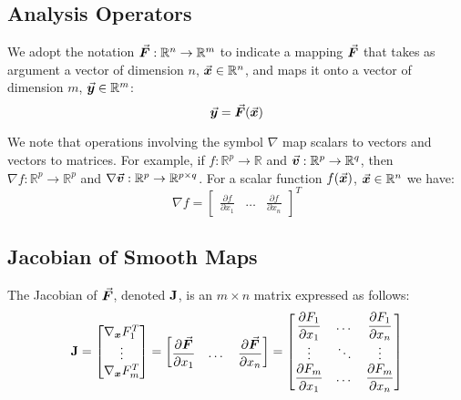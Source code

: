 \begin{appendices}
\section*{Analysis Operators}

We adopt the notation $\vec{\bm{F}}:\mathbb{R}^n\rightarrow\mathbb{R}^m$ to 
indicate a 
mapping $\vec{\bm{F}}$ that takes as argument a vector of dimension $n$, 
$\vec{\bm{x}}\in\mathbb{R}^n$, and maps it onto a vector of dimension $m$, 
$\vec{\bm{y}}\in\mathbb{R}^m$:
\begin{equation*}
	\vec{\bm{y}} = \vec{\bm{F}}(\vec{\bm{x}})
\end{equation*}

We note that operations involving the symbol $\nabla$ map scalars to
vectors and vectors to matrices. For example, if $f:\mathbb{R}^p\rightarrow 
\mathbb{R}$ and
$\vec{\bm{v}}:\mathbb{R}^p\rightarrow\mathbb{R}^q$, then $\nabla
f:\mathbb{R}^p\rightarrow\mathbb{R}^p$ and
$\nabla\vec{\bm{v}}:\mathbb{R}^p\rightarrow\mathbb{R}^{p\times q}$. For a scalar 
function 
$f(\vec{\bm{x}})$, $\vec{\bm{x}}\in\mathbb{R}^n$ we have:
\begin{equation*}
	\nabla f = \begin{bmatrix}
		\displaystyle\frac{\partial f}{\partial x_1} & \dots & 
		\displaystyle\frac{\partial f}{\partial x_n}
	\end{bmatrix}^T
\end{equation*}

\subsection*{Jacobian of Smooth Maps}
The Jacobian of $\vec{\bm{F}}$, denoted $\mathbf{J}$, is an $m\times n$ matrix 
expressed as 
follows:
\begin{equation*}
	\mathbf{J} = \begin{bmatrix}
		\nabla_{\bm{x}}F_1^T\\
		\vdots\\
		\nabla_{\bm{x}}F_m^T\\
	\end{bmatrix} = \begin{bmatrix}
		\displaystyle	\frac{\partial \vec{\bm{F}}}{\partial x_1} & \dots & 
		\displaystyle\frac{\partial \vec{\bm{F}}}{\partial 
			x_n}\end{bmatrix} = \begin{bmatrix}
		\displaystyle\frac{\partial F_1}{\partial x_1} & \dots & 
		\displaystyle\frac{\partial F_1}{\partial x_n}\\
		\vdots & \ddots & \vdots\\
		\displaystyle\frac{\partial F_m}{\partial x_1} & \dots & 
		\displaystyle\frac{\partial F_m}{\partial x_n} 
	\end{bmatrix}
\end{equation*}


\end{appendices}
